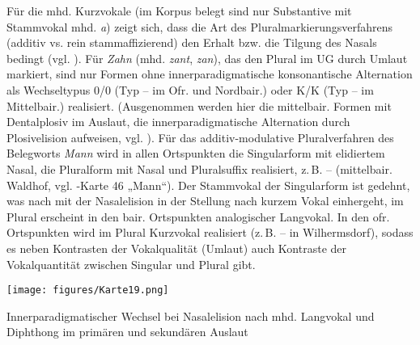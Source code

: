Für die mhd. Kurzvokale (im Korpus belegt sind nur Substantive mit Stammvokal mhd. \textit{a}) zeigt sich, dass die Art des Pluralmarkierungsverfahrens (additiv vs. rein stammaffizierend) den Erhalt bzw. die Tilgung des Nasals bedingt (vgl. \citealt[125]{Rowley1997}). Für \textit{Zahn} (mhd. \textit{zant}, \textit{zan}), das den Plural im UG durch Umlaut markiert, sind nur Formen ohne innerparadigmatische konsonantische Alternation als Wechseltypus 0/0 (Typ  --  im Ofr. und Nordbair.) oder K/K (Typ  --  im Mittelbair.) realisiert. (Ausgenommen werden hier die mittelbair. Formen mit Dentalplosiv im Auslaut, die innerparadigmatische Alternation durch Plosivelision aufweisen, vgl. ). Für das additiv-modulative Pluralverfahren des Belegworts \textit{Mann} wird in allen Ortspunkten die Singularform mit elidiertem Nasal, die Pluralform mit Nasal und Pluralsuffix realisiert, z.\,B.  --  (mittelbair. Waldhof, vgl. \citealt{WA}-Karte 46 „Mann“). Der Stammvokal der Singularform ist gedehnt, was nach \citet[385]{Schirmunski1962} mit der Nasalelision in der Stellung nach kurzem Vokal einhergeht, im Plural erscheint in den bair. Ortspunkten analogischer Langvokal. In den ofr. Ortspunkten wird im Plural Kurzvokal realisiert (z.\,B.  --  in Wilhermsdorf), sodass es neben Kontrasten der Vokalqualität (Umlaut) auch Kontraste der Vokalquantität zwischen Singular und Plural gibt.


\begin{map}
\texttt{[image: figures/Karte19.png]}
\caption{Innerparadigmatischer Wechsel bei Nasalelision nach mhd. Langvokal und Diphthong im primären und sekundären Auslaut}
\label{map:19}
\end{map}

